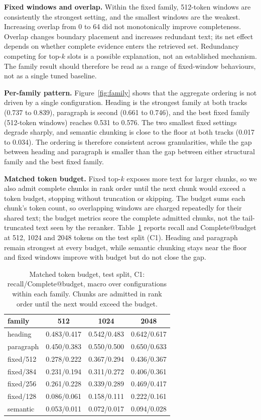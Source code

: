\documentclass[conference]{IEEEtran}
\begin{document}
\textbf{Fixed windows and overlap.}
Within the fixed family, 512-token windows are consistently the strongest setting, and the smallest windows are the weakest. Increasing overlap from 0 to 64 did not monotonically improve completeness. Overlap changes boundary placement and increases redundant text; its net effect depends on whether complete evidence enters the retrieved set. Redundancy competing for top-$k$ slots is a possible explanation, not an established mechanism. The family result should therefore be read as a range of fixed-window behaviours, not as a single tuned baseline.

\textbf{Per-family pattern.}
Figure~\ref{fig:family} shows that the aggregate ordering is not driven by a single configuration. Heading is the strongest family at both tracks (0.737 to 0.839), paragraph is second (0.661 to 0.746), and the best fixed family (512-token windows) reaches 0.531 to 0.576. The two smallest fixed settings degrade sharply, and semantic chunking is close to the floor at both tracks (0.017 to 0.034). The ordering is therefore consistent across granularities, while the gap between heading and paragraph is smaller than the gap between either structural family and the best fixed family.

\textbf{Matched token budget.}
Fixed top-$k$ exposes more text for larger chunks, so we also admit complete chunks in rank order until the next chunk would exceed a token budget, stopping without truncation or skipping. The budget sums each chunk's token count, so overlapping windows are charged repeatedly for their shared text; the budget metrics score the complete admitted chunks, not the tail-truncated text seen by the reranker. Table~\ref{tab:budget} reports recall and Complete@budget at 512, 1024 and 2048 tokens on the test split (C1). Heading and paragraph remain strongest at every budget, while semantic chunking stays near the floor and fixed windows improve with budget but do not close the gap.

\begin{table}[t]
\centering
\caption{Matched token budget, test split, C1: recall/Complete@budget, macro over configurations within each family. Chunks are admitted in rank order until the next would exceed the budget.}
\label{tab:budget}
\small
\begin{tabular}{lccc}
\toprule
family & 512 & 1024 & 2048\\
\midrule
heading & 0.483/0.417 & 0.542/0.483 & 0.642/0.617\\
paragraph & 0.450/0.383 & 0.550/0.500 & 0.650/0.633\\
fixed/512 & 0.278/0.222 & 0.367/0.294 & 0.436/0.367\\
fixed/384 & 0.231/0.194 & 0.311/0.272 & 0.406/0.361\\
fixed/256 & 0.261/0.228 & 0.339/0.289 & 0.469/0.417\\
fixed/128 & 0.086/0.061 & 0.158/0.111 & 0.222/0.161\\
semantic & 0.053/0.011 & 0.072/0.017 & 0.094/0.028\\
\bottomrule
\end{tabular}
\end{table}
\end{document}
